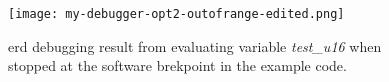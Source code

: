 \begin{figure}[h]
    \centering
    \texttt{[image: my-debugger-opt2-outofrange-edited.png]}
	\caption{\gls{erd} debugging result from evaluating variable \emph{test\_u16} when stopped at the software brekpoint in the example code.}
    \label{fig:mydebuggeroutofrange}
\end{figure}

